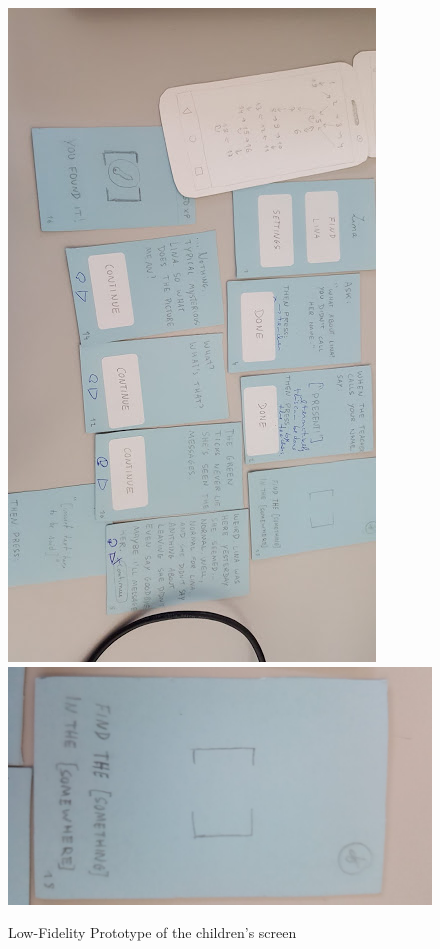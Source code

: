 \documentclass[runningheads]{llncs}
\begin{document}
\begin{figure}
    \centering
    \includegraphics[scale = 0.38, angle = 90]{paper_proto2.jpg}
    \includegraphics[scale = 0.12, angle = 90]{paper_proto4.jpg}
    \caption{Low-Fidelity Prototype of the children's screen}
    \label{fig:LFP}
\end{figure}
\end{document}
